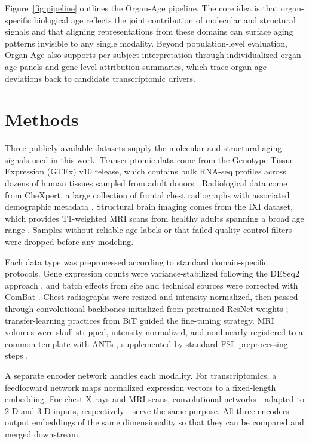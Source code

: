 \documentclass[10pt,twocolumn]{article}
\begin{document}
Figure~\ref{fig:pipeline} outlines the Organ-Age pipeline. The core idea is that
organ-specific biological age reflects the joint contribution of molecular and structural
signals and that aligning representations from these domains can surface aging patterns
invisible to any single modality. Beyond population-level evaluation, Organ-Age also supports
per-subject interpretation through individualized organ-age panels and gene-level
attribution summaries, which trace organ-age deviations back to candidate transcriptomic
drivers.

\section{Methods}

Three publicly available datasets supply the molecular and structural aging signals used in
this work. Transcriptomic data come from the Genotype-Tissue Expression (GTEx) v10 release,
which contains bulk RNA-seq profiles across dozens of human tissues sampled from adult donors
\cite{gtex2017}. Radiological data come from CheXpert, a large collection of frontal chest
radiographs with associated demographic metadata \cite{irvin2019chexpert}. Structural brain
imaging comes from the IXI dataset, which provides T1-weighted MRI scans from healthy adults
spanning a broad age range \cite{ixi2020}. Samples without reliable age labels or that failed
quality-control filters were dropped before any modeling.

Each data type was preprocessed according to standard domain-specific protocols. Gene
expression counts were variance-stabilized following the DESeq2 approach \cite{deseq2}, and
batch effects from site and technical sources were corrected with ComBat \cite{combat2007}.
Chest radiographs were resized and intensity-normalized, then passed through convolutional
backbones initialized from pretrained ResNet weights \cite{he2016resnet}; transfer-learning
practices from BiT \cite{kolesnikov2020bit} guided the fine-tuning strategy. MRI volumes
were skull-stripped, intensity-normalized, and nonlinearly registered to a common template
with ANTs \cite{avants2007ants}, supplemented by standard FSL preprocessing steps
\cite{smith2004fsl}.

A separate encoder network handles each modality. For transcriptomics, a feedforward network
maps normalized expression vectors to a fixed-length embedding. For chest X-rays and MRI
scans, convolutional networks---adapted to 2-D and 3-D inputs, respectively---serve the
same purpose. All three encoders output embeddings of the same dimensionality so that they
can be compared and merged downstream.
\end{document}
